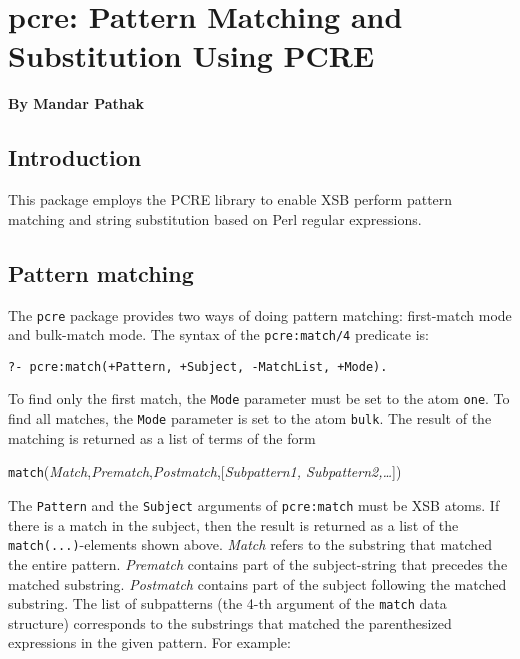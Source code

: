 
\chapter{pcre: Pattern Matching and Substitution Using PCRE}
\label{chap-pcre}

\begin{center}
{\Large {\bf By Mandar Pathak}}
\end{center}

\section{Introduction}

This package employs the PCRE library to enable XSB perform pattern
matching and string substitution based on Perl regular expressions.

\section{Pattern matching}

The {\tt pcre} package provides two ways of doing pattern matching:
first-match mode and bulk-match mode. The syntax of the {\tt pcre:match/4}
predicate is:

\begin{verbatim}
?- pcre:match(+Pattern, +Subject, -MatchList, +Mode).
\end{verbatim}

To find only the first match, the {\tt Mode}  parameter must be set to the atom
{\tt one}. To find all matches, the {\tt Mode}  parameter is set to the atom
{\tt bulk}. The result of the matching is returned as a list of 
terms of the form

\begin{center}
\texttt{match}(\textit{Match},\textit{Prematch},\textit{Postmatch},[\textit{Subpattern1, Subpattern2,\ldots}])
\end{center}

The {\tt Pattern} and the {\tt Subject} arguments of {\tt pcre:match} must
be XSB atoms. If there is a match in the subject, then the result is
returned as a list of the \texttt{match(...)}-elements
shown above. \textit{Match} refers to the
substring that matched the entire pattern. \textit{Prematch} contains part
of the subject-string that precedes the matched substring.
\textit{Postmatch} contains part of the subject following the matched
substring. The list of subpatterns (the 4-th argument of the {\tt match}
data structure) corresponds to the substrings that matched the
parenthesized expressions in the given pattern. For example:

